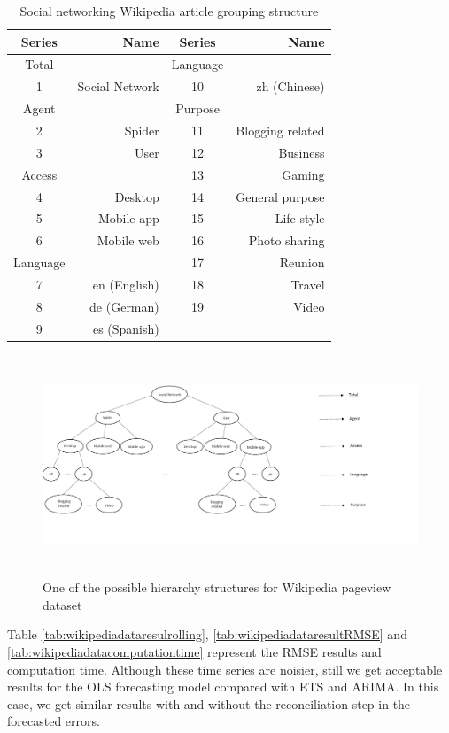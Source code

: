 \documentclass[11pt,a4paper,]{article}
\begin{document}
\begin{table}[t]

\caption{\label{tab:wikipediagroupingstructure}Social networking Wikipedia article grouping structure}
\centering
\begin{tabular}{crcr}
\toprule
Series & Name & Series & Name\\
\midrule
Total &  & Language & \\
1 & Social Network & 10 & zh (Chinese)\\
Agent &  & Purpose & \\
2 & Spider & 11 & Blogging related\\
3 & User & 12 & Business\\
Access &  & 13 & Gaming\\
4 & Desktop & 14 & General purpose\\
5 & Mobile app & 15 & Life style\\
6 & Mobile web & 16 & Photo sharing\\
Language &  & 17 & Reunion\\
7 & en (English) & 18 & Travel\\
8 & de (German) & 19 & Video\\
9 & es (Spanish) &  & \\
\bottomrule
\end{tabular}
\end{table}

\begin{figure}

{\centering \includegraphics[width=500px,height=250px]{Paper-Figures/Wiki_group_structure} 

}

\caption{One of the possible hierarchy structures for Wikipedia pageview dataset}\label{fig:wikigroupstructure}
\end{figure}

Table \ref{tab:wikipediadataresulrolling}, \ref{tab:wikipediadataresultRMSE} and \ref{tab:wikipediadatacomputationtime} represent the RMSE results and computation time. Although these time series are noisier, still we get acceptable results for the OLS forecasting model compared with ETS and ARIMA. In this case, we get similar results with and without the reconciliation step in the forecasted errors.
\end{document}
